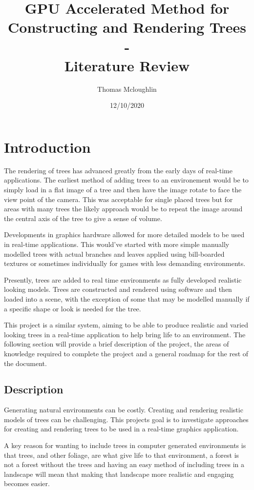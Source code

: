 \documentclass[review]{cmpreport}
\title{GPU Accelerated Method for Constructing and Rendering Trees 
        \\ - \\ 
        Literature Review}
\author{Thomas Mcloughlin}
\date{12/10/2020}
\begin{document}
\maketitle

\section{Introduction}
The rendering of trees has advanced greatly from the early days of real-time 
applications. The earliest method of adding trees to an environement would be 
to simply load in a flat image of a tree and then have the image rotate to face 
the view point of the camera. This was acceptable for single placed trees but 
for areas with many trees the likely approach would be to repeat the image 
around the central axis of the tree to give a sense of volume. \par
Developments in graphics hardware allowed for more detailed models to be used 
in real-time applications. This would've started with more simple manually 
modelled trees with actual branches and leaves applied using bill-boarded 
textures or sometimes individually for games with less demanding environments.
\par Presently, trees are added to real time environments as fully developed 
realistic looking models. Trees are constructed and rendered using software and 
then loaded into a scene, with the exception of some that may be modelled 
manually if a specific shape or look is needed for the tree. \par
This project is a similar system, aiming to be able to produce realistic 
and varied looking trees in a real-time application to help bring life to an 
environment. The following section will provide a brief description of the 
project, the areas of knowledge required to complete the project and a general 
roadmap for the rest of the document.

\subsection{Description}
Generating natural environments can be costly. Creating and rendering realistic 
models of trees can be challenging. This projects goal is to investigate 
approaches for creating and rendering trees to be used in a real-time graphics 
application. \par
A key reason for wanting to include trees in computer generated environments is 
that trees, and other foliage, are what give life to that environment, a forest 
is not a forest without the trees and having an easy method of including trees 
in a landscape will mean that making that landscape more realistic and engaging 
becomes easier.
\end{document}
